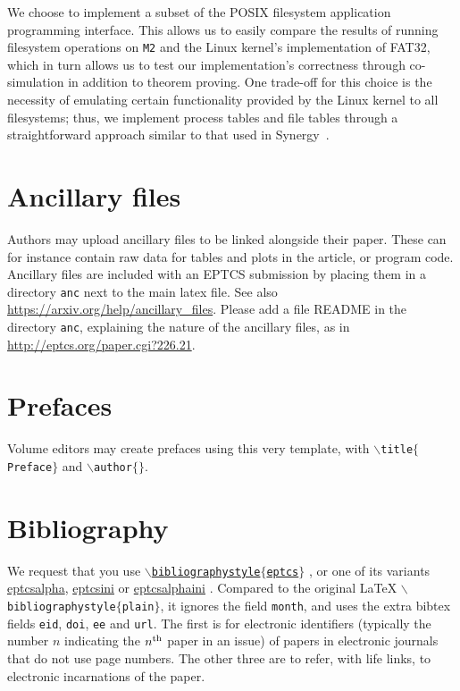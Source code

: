 \documentclass[submission,copyright,creativecommons]{eptcs}
\begin{document}
We choose to implement a subset of the POSIX filesystem application
programming interface. This allows us to easily compare the results of
running filesystem operations on \texttt{M2} and the Linux kernel's
implementation of FAT32, which in turn allows us to test our
implementation's correctness through co-simulation in addition to
theorem proving. One trade-off for this choice is the necessity of
emulating certain functionality provided by the Linux kernel to all
filesystems; thus, we implement process tables and file tables through
a straightforward approach similar to that used in
Synergy~\cite{bevier1996executable}.

\section{Ancillary files}

Authors may upload ancillary files to be linked alongside their paper.
These can for instance contain raw data for tables and plots in the
article, or program code.  Ancillary files are included with an EPTCS
submission by placing them in a directory \texttt{anc} next to the
main latex file. See also \url{https://arxiv.org/help/ancillary_files}.
Please add a file README in the directory \texttt{anc}, explaining the
nature of the ancillary files, as in
\url{http://eptcs.org/paper.cgi?226.21}.

\section{Prefaces}

Volume editors may create prefaces using this very template,
with {\tt $\backslash$title$\{$Preface$\}$} and {\tt $\backslash$author$\{\}$}.

\section{Bibliography}

We request that you use
\href{http://eptcs.web.cse.unsw.edu.au/eptcs.bst}
{\tt $\backslash$bibliographystyle$\{$eptcs$\}$}
\cite{bibliographystylewebpage}, or one of its variants
\href{http://eptcs.web.cse.unsw.edu.au/eptcsalpha.bst}{eptcsalpha},
\href{http://eptcs.web.cse.unsw.edu.au/eptcsini.bst}{eptcsini} or
\href{http://eptcs.web.cse.unsw.edu.au/eptcsalphaini.bst}{eptcsalphaini}
\cite{bibliographystylewebpage}. Compared to the original {\LaTeX}
{\tt $\backslash$biblio\-graphystyle$\{$plain$\}$},
it ignores the field {\tt month}, and uses the extra
bibtex fields {\tt eid}, {\tt doi}, {\tt ee} and {\tt url}.
The first is for electronic identifiers (typically the number $n$
indicating the $n^{\rm th}$ paper in an issue) of papers in electronic
journals that do not use page numbers. The other three are to refer,
with life links, to electronic incarnations of the paper.
\end{document}
